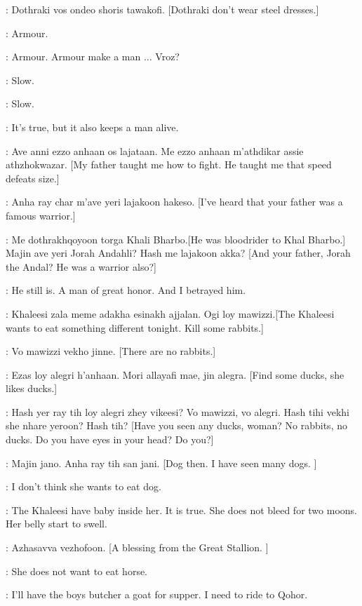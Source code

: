 \RAKHARO: Dothraki vos ondeo shoris tawakofi. [Dothraki don't wear steel dresses.]

\JORAH: Armour. 

\RAKHARO: Armour. Armour make a man $\ldots$ Vroz? 

\JORAH: Slow. 

\RAKHARO: Slow. 

\JORAH: It's true, but it also keeps a man alive. 

\RAKHARO: Ave anni ezzo anhaan os lajataan. Me ezzo anhaan m'athdikar assie athzhokwazar. [My father taught me how to fight. He taught me that speed defeats size.]

\JORAH:  Anha ray char m'ave yeri lajakoon hakeso. [I've heard that your father was a famous warrior.]

\RAKHARO: Me dothrakhqoyoon torga Khali Bharbo.[He was bloodrider to Khal Bharbo.] Majin ave yeri Jorah Andahli? Hash me lajakoon akka?  [And your father, Jorah the Andal? He was a warrior also?]

\JORAH: He still is. A man of great honor. And I betrayed him. 


\IRRI:  Khaleesi zala meme adakha esinakh ajjalan. Ogi loy mawizzi.[The Khaleesi wants to eat something different tonight. Kill some rabbits.]

\RAKHARO: Vo mawizzi vekho jinne. [There are no rabbits.]

\IRRI: Ezas loy alegri h'anhaan. Mori allayafi mae, jin alegra. [Find some ducks, she likes ducks.]

\RAKHARO:  Hash yer ray tih loy alegri zhey vikeesi? Vo mawizzi, vo alegri. Hash tihi vekhi she nhare yeroon? Hash tih? [Have you seen any ducks, woman? No rabbits, no ducks. Do you have eyes in your head? Do you?] 

\IRRI: Majin jano. Anha ray tih san jani. [Dog then. I have seen many dogs. ]

\JORAH: I don't think she wants to eat dog. 

\IRRI: The Khaleesi have baby inside her. It is true. She does not bleed for two moons. Her belly start to swell. 

\RAKHARO: Azhasavva vezhofoon. [A blessing from the Great Stallion. ]

\IRRI: She does not want to eat horse. 

\JORAH: I'll have the boys butcher a goat for supper. I need to ride to Qohor. 

